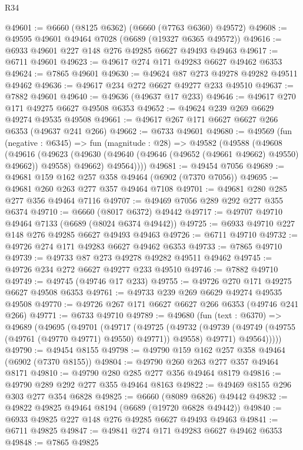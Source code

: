 \begin{lexlean}{R34}
\begin{coremodule}
@49601 := @6660 (@8125 @6362) (@6660 (@7763 @6360) @49572)
@49608 := @49595 @49601 @49464 @7028 (@6689 (@19327 @6365 @49572))
@49616 := @6933 @49601 @227 @148 @276 @49285 @6627 @49493 @49463
@49617 := @6711 @49601
@49623 := @49617 @274 @171 @49283 @6627 @49462 @6353
@49624 := @7865 @49601
@49630 := @49624 @87 @273 @49278 @49282 @49511 @49462
@49636 := @49617 @234 @272 @6627 @49277 @233 @49510
@49637 := @7882 @49601
@49640 := @49636 (@49637 @17 @233)
@49646 := @49617 @270 @171 @49275 @6627 @49508 @6353
@49652 := @49624 @239 @269 @6629 @49274 @49535 @49508
@49661 := @49617 @267 @171 @6627 @6627 @266 @6353 (@49637 @241 @266)
@49662 := @6733 @49601
@49680 := @49569
    (fun (negative : @6345) =>
    fun (magnitude : @28) =>
    @49582
      (@49588
        (@49608
          (@49616
            (@49623 (@49630 (@49640 (@49646 (@49652 (@49661 @49662) @49550) @49662)) @49558) @49662)
            @49564))))
@49681 := @49454 @7056
@49689 := @49681 @159 @162 @257 @358 @49464 (@6902 (@7370 @7056))
@49695 := @49681 @260 @263 @277 @357 @49464 @7108
@49701 := @49681 @280 @285 @277 @356 @49464 @7116
@49707 := @49469 @7056 @289 @292 @277 @355 @6374
@49710 := @6660 (@8017 @6372) @49442
@49717 := @49707 @49710 @49464 @7133 (@6689 (@8024 @6374 @49442))
@49725 := @6933 @49710 @227 @148 @276 @49285 @6627 @49493 @49463
@49726 := @6711 @49710
@49732 := @49726 @274 @171 @49283 @6627 @49462 @6353
@49733 := @7865 @49710
@49739 := @49733 @87 @273 @49278 @49282 @49511 @49462
@49745 := @49726 @234 @272 @6627 @49277 @233 @49510
@49746 := @7882 @49710
@49749 := @49745 (@49746 @17 @233)
@49755 := @49726 @270 @171 @49275 @6627 @49508 @6353
@49761 := @49733 @239 @269 @6629 @49274 @49535 @49508
@49770 := @49726 @267 @171 @6627 @6627 @266 @6353 (@49746 @241 @266)
@49771 := @6733 @49710
@49789 := @49680
    (fun (text : @6370) =>
    @49689
      (@49695
        (@49701
          (@49717
            (@49725
              (@49732
                (@49739 (@49749 (@49755 (@49761 (@49770 @49771) @49550) @49771)) @49558)
                @49771)
              @49564)))))
@49790 := @49454 @8155
@49798 := @49790 @159 @162 @257 @358 @49464 (@6902 (@7370 @8155))
@49804 := @49790 @260 @263 @277 @357 @49464 @8171
@49810 := @49790 @280 @285 @277 @356 @49464 @8179
@49816 := @49790 @289 @292 @277 @355 @49464 @8163
@49822 := @49469 @8155 @296 @303 @277 @354 @6828
@49825 := @6660 (@8089 @6826) @49442
@49832 := @49822 @49825 @49464 @8194 (@6689 (@19720 @6828 @49442))
@49840 := @6933 @49825 @227 @148 @276 @49285 @6627 @49493 @49463
@49841 := @6711 @49825
@49847 := @49841 @274 @171 @49283 @6627 @49462 @6353
@49848 := @7865 @49825

\end{coremodule}
\end{lexlean}
